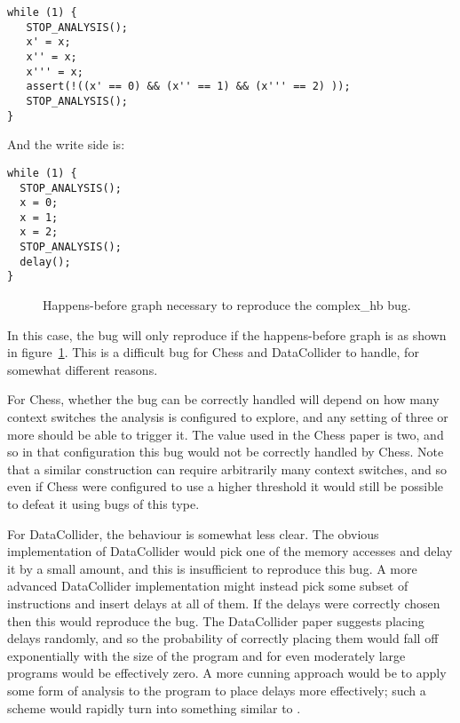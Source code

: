 \begin{verbatim}
while (1) {
   STOP_ANALYSIS();
   x' = x;
   x'' = x;
   x''' = x;
   assert(!((x' == 0) && (x'' == 1) && (x''' == 2) ));
   STOP_ANALYSIS();
}
\end{verbatim}

And the write side is:

\begin{verbatim}
while (1) {
  STOP_ANALYSIS();
  x = 0;
  x = 1;
  x = 2;
  STOP_ANALYSIS();
  delay();
}
\end{verbatim}

\begin{figure}
  \caption{Happens-before graph necessary to reproduce the complex\_hb
    bug.}
  \label{fig:eval:complex_hb}
\end{figure}

In this case, the bug will only reproduce if the happens-before graph
is as shown in figure~\ref{fig:eval:complex_hb}.  This is a difficult
bug for Chess and DataCollider to handle, for somewhat different
reasons.

For Chess, whether the bug can be correctly handled will depend on how
many context switches the analysis is configured to explore, and any
setting of three or more should be able to trigger it.  The value used
in the Chess paper is two, and so in that configuration this bug would
not be correctly handled by Chess.  Note that a similar construction
can require arbitrarily many context switches, and so even if Chess
were configured to use a higher threshold it would still be possible
to defeat it using bugs of this type.

For DataCollider, the behaviour is somewhat less clear.  The obvious
implementation of DataCollider would pick one of the memory accesses
and delay it by a small amount, and this is insufficient to reproduce
this bug.  A more advanced DataCollider implementation might instead
pick some subset of instructions and insert delays at all of them.  If
the delays were correctly chosen then this would reproduce the bug.
The DataCollider paper suggests placing delays randomly, and so the
probability of correctly placing them would fall off exponentially
with the size of the program and for even moderately large programs
would be effectively zero.  A more cunning approach would be to apply
some form of analysis to the program to place delays more effectively;
such a scheme would rapidly turn into something similar to
{\technique}.

